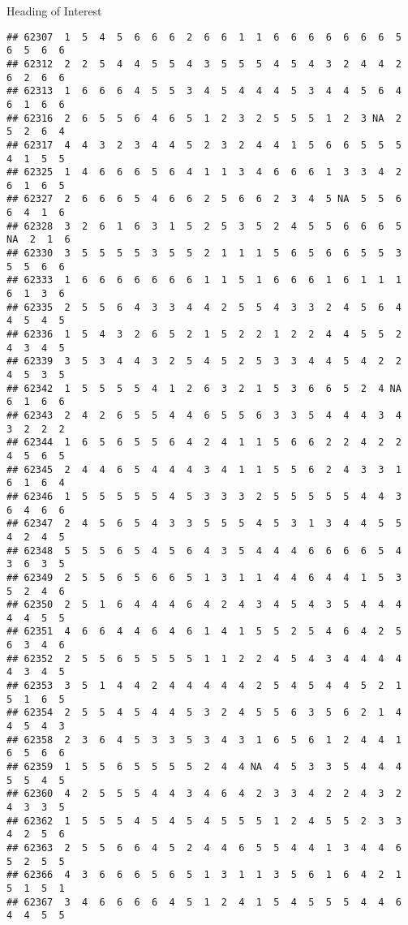 \documentclass[
  ignorenonframetext,
]{beamer}
\begin{document}
\begin{frame}[fragile]{Heading of Interest}
\begin{verbatim}
## 62307  1  5  4  5  6  6  6  2  6  6  1  1  6  6  6  6  6  6  6  5  6  5  6  6
## 62312  2  2  5  4  4  5  5  4  3  5  5  5  4  5  4  3  2  4  4  2  6  2  6  6
## 62313  1  6  6  6  4  5  5  3  4  5  4  4  4  5  3  4  4  5  6  4  6  1  6  6
## 62316  2  6  5  5  6  4  6  5  1  2  3  2  5  5  5  1  2  3 NA  2  5  2  6  4
## 62317  4  4  3  2  3  4  4  5  2  3  2  4  4  1  5  6  6  5  5  5  4  1  5  5
## 62325  1  4  6  6  6  5  6  4  1  1  3  4  6  6  6  1  3  3  4  2  6  1  6  5
## 62327  2  6  6  6  5  4  6  6  2  5  6  6  2  3  4  5 NA  5  5  6  6  4  1  6
## 62328  3  2  6  1  6  3  1  5  2  5  3  5  2  4  5  5  6  6  6  5 NA  2  1  6
## 62330  3  5  5  5  5  3  5  5  2  1  1  1  5  6  5  6  6  5  5  3  5  5  6  6
## 62333  1  6  6  6  6  6  6  6  1  1  5  1  6  6  6  1  6  1  1  1  6  1  3  6
## 62335  2  5  5  6  4  3  3  4  4  2  5  5  4  3  3  2  4  5  6  4  4  5  4  5
## 62336  1  5  4  3  2  6  5  2  1  5  2  2  1  2  2  4  4  5  5  2  4  3  4  5
## 62339  3  5  3  4  4  3  2  5  4  5  2  5  3  3  4  4  5  4  2  2  4  5  3  5
## 62342  1  5  5  5  5  4  1  2  6  3  2  1  5  3  6  6  5  2  4 NA  6  1  6  6
## 62343  2  4  2  6  5  5  4  4  6  5  5  6  3  3  5  4  4  4  3  4  3  2  2  2
## 62344  1  6  5  6  5  5  6  4  2  4  1  1  5  6  6  2  2  4  2  2  4  5  6  5
## 62345  2  4  4  6  5  4  4  4  3  4  1  1  5  5  6  2  4  3  3  1  6  1  6  4
## 62346  1  5  5  5  5  5  4  5  3  3  3  2  5  5  5  5  5  4  4  3  6  4  6  6
## 62347  2  4  5  6  5  4  3  3  5  5  5  4  5  3  1  3  4  4  5  5  4  2  4  5
## 62348  5  5  5  6  5  4  5  6  4  3  5  4  4  4  6  6  6  6  5  4  3  6  3  5
## 62349  2  5  5  6  5  6  6  5  1  3  1  1  4  4  6  4  4  1  5  3  5  2  4  6
## 62350  2  5  1  6  4  4  4  6  4  2  4  3  4  5  4  3  5  4  4  4  4  4  5  5
## 62351  4  6  6  4  4  6  4  6  1  4  1  5  5  2  5  4  6  4  2  5  6  3  4  6
## 62352  2  5  5  6  5  5  5  5  1  1  2  2  4  5  4  3  4  4  4  4  4  3  4  5
## 62353  3  5  1  4  4  2  4  4  4  4  4  2  5  4  5  4  4  5  2  1  5  1  6  5
## 62354  2  5  5  4  5  4  4  5  3  2  4  5  5  6  3  5  6  2  1  4  4  5  4  3
## 62358  2  3  6  4  5  3  3  5  3  4  3  1  6  5  6  1  2  4  4  1  6  5  6  6
## 62359  1  5  5  6  5  5  5  5  2  4  4 NA  4  5  3  3  5  4  4  4  5  5  4  5
## 62360  4  2  5  5  5  4  4  3  4  6  4  2  3  3  4  2  2  4  3  2  4  3  3  5
## 62362  1  5  5  5  4  5  4  5  4  5  5  5  1  2  4  5  5  2  3  3  4  2  5  6
## 62363  2  5  5  6  6  4  5  2  4  4  6  5  5  4  4  1  3  4  4  6  5  2  5  5
## 62366  4  3  6  6  6  5  6  5  1  3  1  1  3  5  6  1  6  4  2  1  5  1  5  1
## 62367  3  4  6  6  6  6  4  5  1  2  4  1  5  4  5  5  5  4  4  6  4  4  5  5

\end{verbatim}
\end{frame}
\end{document}
